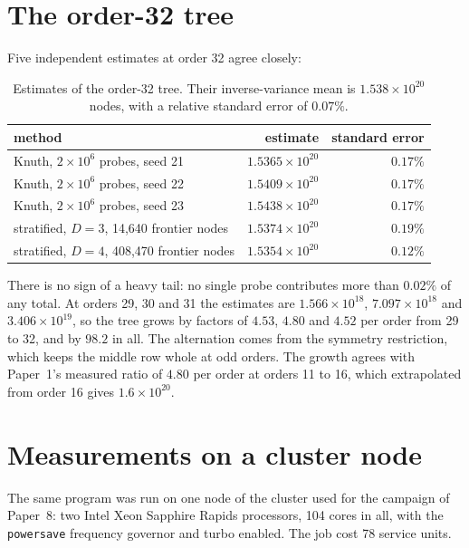 \documentclass[11pt,a4paper,oneside]{report}
\theoremstyle{definition}
\begin{document}
\section{The order-32 tree}
\label{p9-sec:order32}
Five independent estimates at order 32 agree closely:

\begin{table}[H]
\centering
\small
\begin{tabular}{@{}lrr@{}}
\toprule
method & estimate & standard error \\
\midrule
Knuth, $2\times10^6$ probes, seed 21 & $1.5365\times10^{20}$ & $0.17\%$ \\
Knuth, $2\times10^6$ probes, seed 22 & $1.5409\times10^{20}$ & $0.17\%$ \\
Knuth, $2\times10^6$ probes, seed 23 & $1.5438\times10^{20}$ & $0.17\%$ \\
stratified, $D=3$, 14{,}640 frontier nodes & $1.5374\times10^{20}$ & $0.19\%$ \\
stratified, $D=4$, 408{,}470 frontier nodes & $1.5354\times10^{20}$ & $0.12\%$ \\
\bottomrule
\end{tabular}
\caption{Estimates of the order-32 tree. Their inverse-variance mean is $1.538\times10^{20}$ nodes, with a
relative standard error of $0.07\%$.}
\label{p9-tab:order32}
\end{table}

\noindent There is no sign of a heavy tail: no single probe contributes more than $0.02\%$ of any total.
At orders 29, 30 and 31 the estimates are $1.566\times10^{18}$, $7.097\times10^{18}$ and
$3.406\times10^{19}$, so the tree grows by factors of $4.53$, $4.80$ and $4.52$ per order from 29 to 32,
and by $98.2$ in all. The alternation comes from the symmetry restriction, which keeps the middle row
whole at odd orders. The growth agrees with Paper~1's measured ratio of $4.80$ per order at orders 11 to
16, which extrapolated from order 16 gives $1.6\times10^{20}$.

\section{Measurements on a cluster node}
\label{p9-sec:cluster}
The same program was run on one node of the cluster used for the campaign of Paper~8: two Intel Xeon
Sapphire Rapids processors, 104 cores in all, with the \texttt{powersave} frequency governor and turbo
enabled. The job cost 78 service units.
\end{document}
